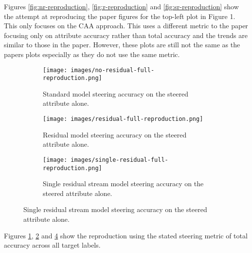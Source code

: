 \documentclass[]{article}
\begin{document}
Figures \ref{fig:nr-reproduction}, \ref{fig:r-reproduction} and \ref{fig:sr-reproduction} show the attempt at reproducing the paper figures for the top-left plot in Figure 1.
This only focuses on the CAA approach.
This uses a different metric to the paper focusing only on attribute accuracy rather than total accuracy and the trends are similar to those in the paper.
However, these plots are still not the same as the papers plots especially as they do not use the same metric.

\begin{figure}
    \centering
    \begin{subfigure}{0.45\textwidth}
        \texttt{[image: images/no-residual-full-reproduction.png]}
        \caption{Standard model steering accuracy on the steered attribute alone.}
        \label{fig:nr-correct}
    \end{subfigure}
    \hfill
    \begin{subfigure}{0.45\textwidth}
        \texttt{[image: images/residual-full-reproduction.png]}
        \caption{Residual model steering accuracy on the steered attribute alone.}
        \label{fig:r-correct}
    \end{subfigure}
    \begin{subfigure}{0.45\textwidth}
        \texttt{[image: images/single-residual-full-reproduction.png]}
        \caption{Single residual stream model steering accuracy on the steered attribute alone.}
        \label{fig:sr-correct}
    \end{subfigure}
\end{figure}

Figures \ref{fig:nr-correct}, \ref{fig:r-correct} and \ref{fig:sr-correct} show the reproduction using the stated steering metric of total accuracy across all target labels.
\end{document}
